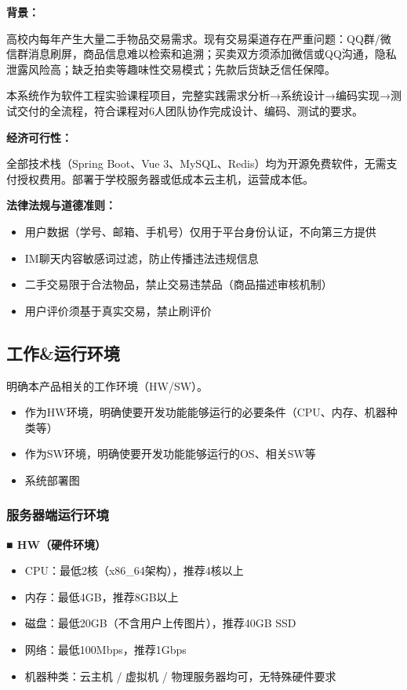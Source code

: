 \documentclass[12pt,a4paper]{ctexart}
\numberwithin{figure}{section}
\numberwithin{table}{section}
\begin{document}
\textbf{背景：}

高校内每年产生大量二手物品交易需求。现有交易渠道存在严重问题：QQ群/微信群消息刷屏，商品信息难以检索和追溯；买卖双方须添加微信或QQ沟通，隐私泄露风险高；缺乏拍卖等趣味性交易模式；先款后货缺乏信任保障。

本系统作为软件工程实验课程项目，完整实践需求分析→系统设计→编码实现→测试交付的全流程，符合课程对6人团队协作完成设计、编码、测试的要求。

\textbf{经济可行性：}

全部技术栈（Spring Boot、Vue 3、MySQL、Redis）均为开源免费软件，无需支付授权费用。部署于学校服务器或低成本云主机，运营成本低。

\textbf{法律法规与道德准则：}

\begin{itemize}
    \item 用户数据（学号、邮箱、手机号）仅用于平台身份认证，不向第三方提供
    \item IM聊天内容敏感词过滤，防止传播违法违规信息
    \item 二手交易限于合法物品，禁止交易违禁品（商品描述审核机制）
    \item 用户评价须基于真实交易，禁止刷评价
\end{itemize}

\subsection{工作\&运行环境}

明确本产品相关的工作环境（HW/SW）。

\begin{itemize}
    \item 作为HW环境，明确使要开发功能能够运行的必要条件（CPU、内存、机器种类等）
    \item 作为SW环境，明确使要开发功能能够运行的OS、相关SW等
    \item 系统部署图
\end{itemize}

\subsubsection{服务器端运行环境}

\textbf{■ HW（硬件环境）}

\begin{itemize}
    \item CPU：最低2核（x86\_64架构），推荐4核以上
    \item 内存：最低4GB，推荐8GB以上
    \item 磁盘：最低20GB（不含用户上传图片），推荐40GB SSD
    \item 网络：最低100Mbps，推荐1Gbps
    \item 机器种类：云主机 / 虚拟机 / 物理服务器均可，无特殊硬件要求
\end{itemize}
\end{document}
